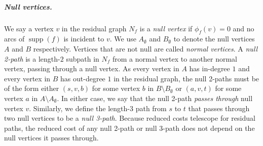 \documentclass[a4paper,UKenglish]{socg-lipics-v2018}
\def\fsupply{\phi}
\def\supp{\operatorname{supp}}
\theoremstyle{plain}
\numberwithin{figure}{section}
\renewcommand{\paragraph}{\subparagraph}
\def\EMPH#1{\textcolor{BrickRed}{{\emph{#1}}}}
\begin{document}
\paragraph{Null vertices.}
We say a vertex $v$ in the residual graph $N_f$ is a \EMPH{null vertex} if $\fsupply_f(v) = 0$ and no arcs of $\supp(f)$ is incident to $v$.
We use \EMPH{$A_\emptyset$} and \EMPH{$B_\emptyset$} to denote the null vertices $A$ and $B$ respectively.
Vertices that are not null are called \EMPH{normal vertices}.
%
A \EMPH{null 2-path} is a length-$2$ subpath in $N_f$ from a normal vertex to another normal vertex, passing through a null vertex.
As every vertex in $A$ has in-degree $1$ and every vertex in $B$ has out-degree $1$ in the residual graph, the null 2-paths must be of the form either $(s, v, b)$ for some vertex $b$ in $B \setminus B_\emptyset$ or $(a, v, t)$ for some vertex $a$ in $A \setminus A_\emptyset$.
In either case, we say that the null 2-path \EMPH{passes through} null vertex $v$.
%
Similarly, we define the length-$3$ path from $s$ to $t$ that passes through two null
vertices to be a \EMPH{null 3-path}.
%
Because reduced costs telescope for residual paths, the reduced cost of any null 2-path or null 3-path does not depend on the null vertices it passes through.
\end{document}
